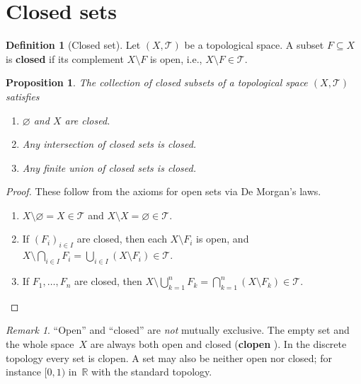 \documentclass[11pt,a4paper,twoside]{book}
\newtheorem{proposition}[theorem]{Proposition}
\theoremstyle{remark}
\newtheorem{remark}[theorem]{Remark}
\theoremstyle{definition}
\theoremstyle{definition}
\newtheorem{definition}{Definition}[section]
\newcommand{\Tau}{\mathcal{T}}           %
\newcommand{\R}{\mathbb{R}}
\begin{document}
\section{Closed sets}
\label{sec:closed-sets}

\begin{definition}[Closed set]\label{def:closed-set}
Let $(X,\Tau)$ be a topological space.  A subset $F\subseteq X$ is
\textbf{closed} if its complement $X\setminus F$ is open, i.e.,
$X\setminus F\in\Tau$.
\end{definition}

\begin{proposition}\label{prop:closed-set-properties}
The collection of closed subsets of a topological space $(X,\Tau)$ satisfies
\begin{enumerate}[label=\textup{(C\arabic*)}]
  \item\label{C1} $\varnothing$ and $X$ are closed.
  \item\label{C2} Any \emph{intersection} of closed sets is closed.
  \item\label{C3} Any \emph{finite union} of closed sets is closed.
\end{enumerate}
\end{proposition}

\begin{proof}
These follow from the axioms for open sets via De Morgan's laws.
\begin{enumerate}[label=(\roman*)]
  \item $X\setminus\varnothing=X\in\Tau$ and $X\setminus X=\varnothing\in\Tau$.
  \item If $(F_i)_{i\in I}$ are closed, then each $X\setminus F_i$ is open,
        and
        $X\setminus\bigcap_{i\in I}F_i=\bigcup_{i\in I}(X\setminus F_i)\in\Tau$.
  \item If $F_1,\ldots,F_n$ are closed, then
        $X\setminus\bigcup_{k=1}^{n}F_k=\bigcap_{k=1}^{n}(X\setminus F_k)\in\Tau$.
        \qedhere
\end{enumerate}
\end{proof}

\begin{remark}
``Open'' and ``closed'' are \emph{not} mutually exclusive.  The empty set and
the whole space~$X$ are always both open and closed (\textbf{clopen}%
).  In the discrete topology every set is clopen.  A set may
also be neither open nor closed; for instance $[0,1)$ in~$\R$ with the standard
topology.
\end{remark}
\end{document}

